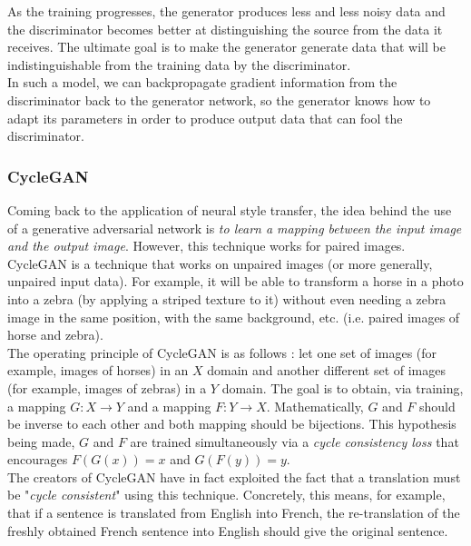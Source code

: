 \documentclass[twocolumn,superscriptaddress,aps, floatfix]{revtex4-1}
\begin{document}
    As the training progresses, the generator produces less and less noisy data and the discriminator becomes better at distinguishing the source from the data it receives. The ultimate goal is to make the generator generate data that will be indistinguishable from the training data by the discriminator.\\
    
    In such a model, we can backpropagate gradient information from the discriminator back to the generator network, so the generator knows how to adapt its parameters in order to produce output data that can fool the discriminator.
    
    \subsubsection{CycleGAN}
    
    Coming back to the application of neural style transfer, the idea behind the use of a generative adversarial network is \emph{to learn a mapping between the input image and the output image}. However, this technique works for paired images. CycleGAN is a technique that works on unpaired images (or more generally, unpaired input data). For example, it will be able to transform a horse in a photo into a zebra (by applying a striped texture to it) without even needing a zebra image in the same position, with the same background, etc. (i.e. paired images of horse and zebra).\\
    
    The operating principle of CycleGAN is as follows : let one set of images (for example, images of horses) in an $X$ domain and another different set of images (for example, images of zebras) in a $Y$ domain. The goal is to obtain, via training, a mapping $G : X \rightarrow Y$ and a mapping $F : Y \rightarrow X$. Mathematically, $G$ and $F$ should be inverse to each other and both mapping should be bijections. This hypothesis being made, $G$ and $F$ are trained simultaneously via a \emph{cycle consistency loss} that encourages $F(G(x)) = x$ and $G(F(y)) = y$.\\
    
    The creators of CycleGAN have in fact exploited the fact that a translation must be "\emph{cycle consistent}" using this technique. Concretely, this means, for example, that if a sentence is translated from English into French, the re-translation of the freshly obtained French sentence into English should give the original sentence.\\
    
\end{document}
